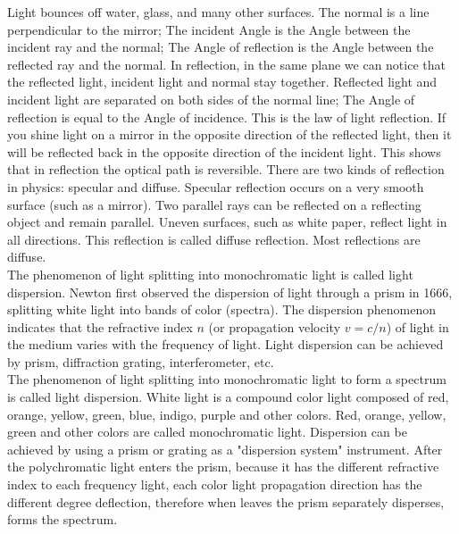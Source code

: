 \documentclass[a4paper]{article}
\begin{document}
Light bounces off water, glass, and many other surfaces. The normal is a line perpendicular to the mirror; The incident Angle is the Angle between the incident ray and the normal; The Angle of reflection is the Angle between the reflected ray and the normal. In reflection, in the same plane we can notice that the reflected light, incident light and normal stay together. Reflected light and incident light are separated on both sides of the normal line;\cite{cJ. Geisler} The Angle of reflection is equal to the Angle of incidence. This is the law of light reflection. If you shine light on a mirror in the opposite direction of the reflected light, then it will be reflected back in the opposite direction of the incident light. This shows that in reflection the optical path is reversible. There are two kinds of reflection in physics: specular and diffuse. Specular reflection occurs on a very smooth surface (such as a mirror). Two parallel rays can be reflected on a reflecting object and remain parallel. Uneven surfaces, such as white paper, reflect light in all directions. This reflection is called diffuse reflection. Most reflections are diffuse.
\\

The phenomenon of light splitting into monochromatic light is called light dispersion. Newton first observed the dispersion of light through a prism in 1666, splitting white light into bands of color (spectra). The dispersion phenomenon indicates that the refractive index $n$ (or propagation velocity $v=c/n$) of light in the medium varies with the frequency of light.\cite{cJ. Geisler} Light dispersion can be achieved by prism, diffraction grating, interferometer, etc.
\\

The phenomenon of light splitting into monochromatic light to form a spectrum is called light dispersion. White light is a compound color light composed of red, orange, yellow, green, blue, indigo, purple and other colors. Red, orange, yellow, green and other colors are called monochromatic light. Dispersion can be achieved by using a prism or grating as a "dispersion system" instrument. After the polychromatic light enters the prism, because it has the different refractive index to each frequency light, each color light propagation direction has the different degree deflection, therefore when leaves the prism separately disperses, forms the spectrum.\\
\end{document}
